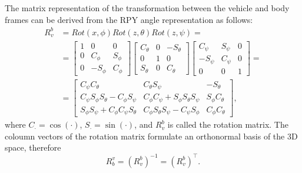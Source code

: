 The matrix representation of the transformation between the vehicle and body frames can be derived from the RPY angle representation as follows:
\begin{equation}\label{eq:rot}
\begin{split}
R_v^b& = Rot(x,\phi)Rot(z,\theta)Rot(z,\psi) = \\
&=\left[\begin{array}{ccc}1 & 0 & 0 \\ 0 & C_ \phi &  S_ \phi \\ 0 & - S_ \phi & C_ \phi\end{array}\right]\left[\begin{array}{ccc} C_ \theta & 0 &  -S_ \theta \\ 0 & 1 & 0 \\  S_ \theta & 0 &  C_ \theta\end{array}\right]\left[\begin{array}{ccc} C_ \psi & S_ \psi & 0 \\ - S_ \psi &  C_ \psi & 0 \\ 0 & 0 & 1\end{array}\right]=\\
&=\left[\begin{array}{ccc} C_\psi C_\theta &  C_\theta S_\psi & -S_\theta \\
C_\psi S_\phi S_\theta - C_\phi S_\psi & C_\phi C_\psi + S_\phi S_\theta S_\psi & S_\phi C_\theta \\
S_\phi S_\psi + C_\phi C_\psi S_\theta & C_\phi S_\theta S_\psi - C_\psi S_\phi & C_\phi C_\theta
\end{array}\right],     %
\end{split}
\end{equation}
where $C_\cdot = \cos(\cdot)$, $S_\cdot = \sin(\cdot)$, and $R_v^b$ is called the rotation matrix. The coloumn vectors of the rotation matrix formulate an orthonormal basis of the 3D space, therefore
\begin{equation}
R_b^v = \left(R_v^b\right)^{-1} = \left(R_v^b\right)^\top.
\end{equation}

